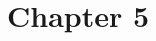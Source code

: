 




\setcounter{chapter}{4}
\chapter{Chapter 5}





%
%
%
%
%
%
%
%
%
%
%
%
%
%
%
%
%
%
%
%
%
%
%
%
%
%
%
%
%



